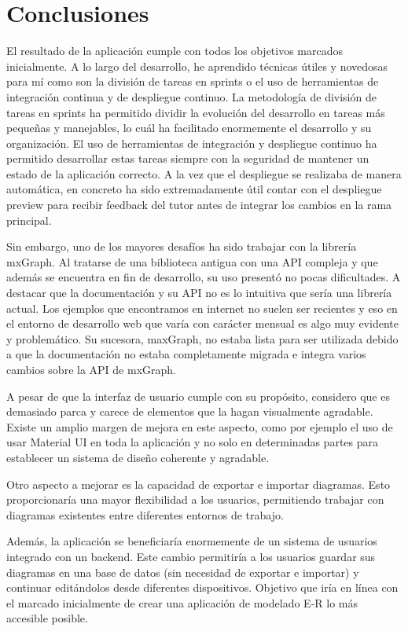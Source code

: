 
\section{Conclusiones}

El resultado de la aplicación cumple con todos los objetivos marcados inicialmente. A lo largo del desarrollo, he aprendido técnicas útiles y novedosas para mí como son la división de tareas en sprints o el uso de herramientas de integración continua y de despliegue continuo.
La metodología de división de tareas en sprints ha permitido dividir la evolución del desarrollo en tareas más pequeñas y manejables, lo cuál ha facilitado enormemente el desarrollo y su organización.
El uso de herramientas de integración y despliegue continuo ha permitido desarrollar estas tareas siempre con la seguridad de mantener un estado de la aplicación correcto. A la vez que el despliegue se realizaba de manera automática, en concreto ha sido extremadamente útil contar con el despliegue preview para recibir feedback del tutor antes de integrar los cambios en la rama principal.

Sin embargo, uno de los mayores desafíos ha sido trabajar con la librería mxGraph. Al tratarse de una biblioteca antigua con una API compleja y que además se encuentra en fin de desarrollo, su uso presentó no pocas dificultades. A destacar que la documentación y su API no es lo intuitiva que sería una librería actual. Los ejemplos que encontramos en internet no suelen ser recientes y eso en el entorno de desarrollo web que varía con carácter mensual es algo muy evidente y problemático.
Su sucesora, maxGraph, no estaba lista para ser utilizada debido a que la documentación no estaba completamente migrada e integra varios cambios sobre la API de mxGraph.

A pesar de que la interfaz de usuario cumple con su propósito, considero que es demasiado parca y carece de elementos que la hagan visualmente agradable. Existe un amplio margen de mejora en este aspecto, como por ejemplo el uso de usar Material UI en toda la aplicación y no solo en determinadas partes para establecer un sistema de diseño coherente y agradable.

Otro aspecto a mejorar es la capacidad de exportar e importar diagramas. Esto proporcionaría una mayor flexibilidad a los usuarios, permitiendo trabajar con diagramas existentes entre diferentes entornos de trabajo.

Además, la aplicación se beneficiaría enormemente de un sistema de usuarios integrado con un backend. Este cambio permitiría a los usuarios guardar sus diagramas en una base de datos (sin necesidad de exportar e importar) y continuar editándolos desde diferentes dispositivos. Objetivo que iría en línea con el marcado inicialmente de crear una aplicación de modelado E-R lo más accesible posible.

